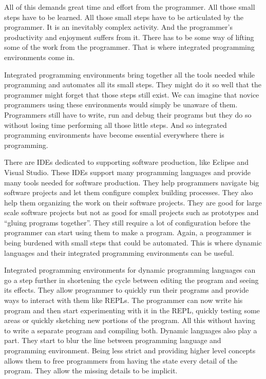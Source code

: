 \documentclass{./llncs2e/llncs}
\begin{document}
	All of this demands great time and effort from the programmer.
	All those small steps have to be learned.
	All those small steps have to be articulated by the programmer.
	It is an inevitably complex activity.
	And the programmer's productivity and enjoyment suffers from it.
	There has to be some way of lifting some of the work from the programmer.
	That is where integrated programming environments come in.

	Integrated programming environments bring together all the tools needed while programming and automates all its small steps.
	They might do it so well that the programmer might forget that those steps still exist.
	We can imagine that novice programmers using these environments would simply be unaware of them.
	Programmers still have to write, run and debug their programs but they do so without losing time performing all those little steps.
	And so integrated programming environments have become essential everywhere there is programming.
	
	There are IDEs dedicated to supporting software production, like Eclipse and Visual Studio.
	These IDEs support many programming languages and provide many tools needed for software production.
	They help programmers navigate big software projects and let them configure complex building processes.
	They also help them organizing the work on their software projects.
	They are good for large scale software projects but not as good for small projects such as prototypes and ``gluing programs together''.
	They still require a lot of configuration before the programmer can start using them to make a program.
	Again, a programmer is being burdened with small steps that could be automated.
	This is where dynamic languages and their integrated programming environments can be useful.

	Integrated programming environments for dynamic programming languages can go a step further in shortening the cycle between editing the program and seeing its effects.
	They allow programmer to quickly run their programs and provide ways to interact with them like REPLs.
	The programmer can now write his program and then start experimenting with it in the REPL, quickly testing some areas or quickly sketching new portions of the program.
	All this without having to write a separate program and compiling both.
	Dynamic languages also play a part.
	They start to blur the line between programming language and programming environment.
	Being less strict and providing higher level concepts allows them to free programmers from having the state every detail of the program.
	They allow the missing details to be implicit.
\end{document}
